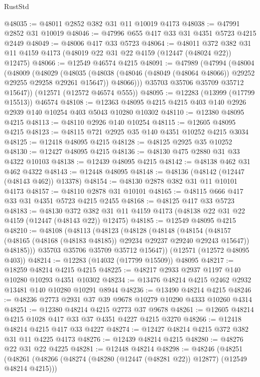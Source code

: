 \begin{lexlean}{RustStd}
\begin{coremodule}
@48035 := @48011 @2852 @382 @31 @11 @10019 @4173
@48038 := @47991 @2852 @31 @10019
@48046 := @47996 @655 @417 @33 @31 @4351 @5723 @4215 @2449
@48049 := @48006 @417 @33 @5723
@48064 := @48011
    @372
    @382
    @31
    @11
    @4159
    @4173
    (@48019 @22 @31 @22 @4159 (@12447 (@48024 @22)) @12475)
@48066 := @12549 @46574 @4215
@48091 := @47989
    (@47994
      (@48004
        (@48009
          (@48029
            (@48035
              (@48038 (@48046 (@48049 (@48064 @48066)) @29252 @29255 @29258 @29261 @15647))
              @48066)))
        @35703
        @35706
        @35709
        @35712
        @15647))
    (@12571 (@12572 @46574 @555))
@48095 := @12283 (@13999 (@17799 @15513)) @46574
@48108 := @12363 @48095 @4215 @4215 @403 @140 @2926 @2939 @140 @10254 @403 @5043 @10280 @10302
@48110 := @12380 @48095 @4215
@48113 := @48110 @2926 @140 @10254
@48115 := @12605 @48095 @4215
@48123 := @48115 @721 @2925 @35 @140 @4351 @10252 @4215 @3034
@48125 := @12418 @48095 @4215
@48128 := @48125 @2925 @35 @10252
@48130 := @12427 @48095 @4215
@48136 := @48130 @475 @2880 @31 @33 @4322 @10103
@48138 := @12439 @48095 @4215
@48142 := @48138 @462 @31 @462 @4322
@48143 := @12448 @48095
@48148 := @48136 (@48142 (@12447 (@48143 @462)) @13378)
@48154 := @48130 @2878 @382 @31 @11 @10101 @4173
@48157 := @48110 @2878 @31 @10101
@48165 := @48115 @666 @417 @33 @31 @4351 @5723 @4215 @2455
@48168 := @48125 @417 @33 @5723
@48183 := @48130
    @372
    @382
    @31
    @11
    @4159
    @4173
    (@48138 @22 @31 @22 @4159 (@12447 (@48143 @22)) @12475)
@48185 := @12549 @48095 @4215
@48210 := @48108
    (@48113
      (@48123
        (@48128
          (@48148
            (@48154
              (@48157 (@48165 (@48168 (@48183 @48185)) @29234 @29237 @29240 @29243 @15647))
              @48185)))
        @35703
        @35706
        @35709
        @35712
        @15647))
    (@12571 (@12572 @48095 @403))
@48214 := @12283 (@14032 (@17799 @15509)) @48095
@48217 := @18259 @48214 @4215 @4215
@48225 := @48217 @2933 @2937 @1197 @140 @10280 @10293 @4351 @10302
@48234 := @13476 @48214 @4215 @2462 @2932 @13481 @140 @10280 @10291 @8944
@48236 := @13490 @48214 @4215
@48246 := @48236 @2773 @2931 @37 @39 @9678 @10279 @10290 @4333 @10260 @4314
@48251 := @12380 @48214 @4215 @2773 @37 @9678
@48261 := @12605 @48214 @4215 @1028 @417 @33 @37 @4351 @4227 @4215 @3270
@48266 := @12418 @48214 @4215 @417 @33 @4227
@48274 := @12427 @48214 @4215 @372 @382 @31 @11 @4225 @4173
@48276 := @12439 @48214 @4215
@48280 := @48276 @22 @31 @22 @4225
@48281 := @12448 @48214
@48298 := @48246
    (@48251
      (@48261
        (@48266 (@48274 (@48280 (@12447 (@48281 @22)) @12877) (@12549 @48214 @4215)))

\end{coremodule}
\end{lexlean}
